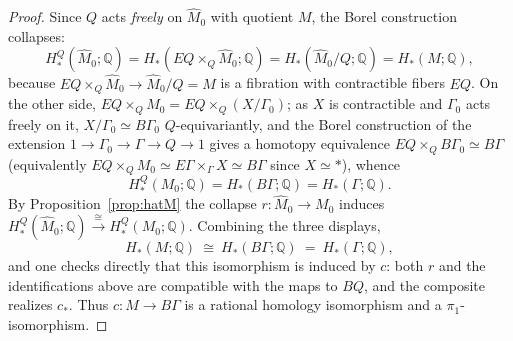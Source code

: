 \documentclass[12pt]{article}
\theoremstyle{definition}
\begin{document}
\begin{proof}
Since $Q$ acts \emph{freely} on $\widehat M_0$ with quotient $M$, the Borel
construction collapses:
\[
   H^Q_*(\widehat M_0;\mathbb{Q})
   = H_*(EQ\times_Q\widehat M_0;\mathbb{Q})
   = H_*(\widehat M_0/Q;\mathbb{Q}) = H_*(M;\mathbb{Q}),
\]
because $EQ\times_Q\widehat M_0\to\widehat M_0/Q=M$ is a fibration with
contractible fibers $EQ$. On the other side, $EQ\times_Q M_0=EQ\times_Q(X/\Gamma_0)$;
as $X$ is contractible and $\Gamma_0$ acts freely on it, $X/\Gamma_0\simeq B\Gamma_0$
$Q$-equivariantly, and the Borel construction of the extension
$1\to\Gamma_0\to\Gamma\to Q\to1$ gives a homotopy equivalence
$EQ\times_Q B\Gamma_0\simeq B\Gamma$ (equivalently
$EQ\times_Q M_0\simeq E\Gamma\times_\Gamma X\simeq B\Gamma$ since $X\simeq\ast$),
whence
\[
   H^Q_*(M_0;\mathbb{Q})=H_*(B\Gamma;\mathbb{Q})=H_*(\Gamma;\mathbb{Q}).
\]
By Proposition~\ref{prop:hatM} the collapse $r\colon\widehat M_0\to M_0$ induces
$H^Q_*(\widehat M_0;\mathbb{Q})\xrightarrow{\cong}H^Q_*(M_0;\mathbb{Q})$.
Combining the three displays,
\begin{equation}\label{eq:Mhomology}
   H_*(M;\mathbb{Q})\ \cong\ H_*(B\Gamma;\mathbb{Q})\ =\ H_*(\Gamma;\mathbb{Q}),
\end{equation}
and one checks directly that this isomorphism is induced by $c$: both $r$ and the
identifications above are compatible with the maps to $BQ$, and the composite
realizes $c_*$. Thus $c\colon M\to B\Gamma$ is a rational homology isomorphism
and a $\pi_1$-isomorphism.


\end{proof}
\end{document}
